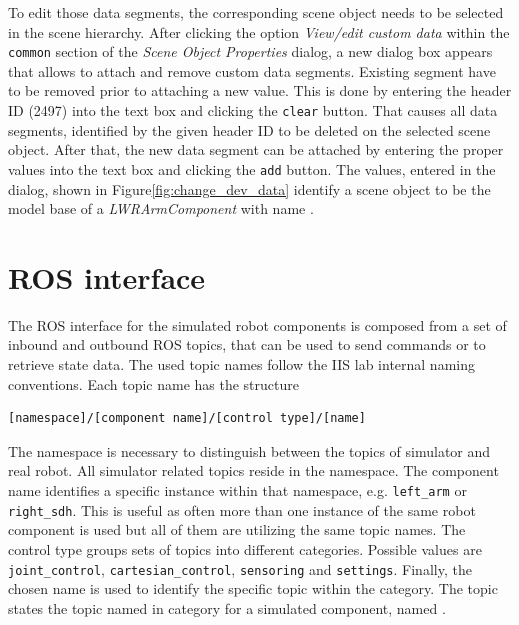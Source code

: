 To edit those data segments, the corresponding scene object needs to be selected in the scene hierarchy. After clicking the option \emph{View/edit custom data} within the \texttt{common} section of the \emph{Scene Object Properties} dialog, a new dialog box appears that allows to attach and remove custom data segments. Existing segment have to be removed prior to attaching a new value. This is done by entering the header ID (2497) into the text box and clicking the \texttt{clear} button. That causes all data segments, identified by the given header ID to be deleted on the selected scene object. After that, the new data segment can be attached by entering the proper values into the text box and clicking the \texttt{add} button. The values, entered in the dialog, shown in Figure\ref{fig:change_dev_data} identify a scene object to be the model base of a \emph{LWRArmComponent} with name .

\section{ROS interface}

The ROS interface for the simulated robot components is composed from a set of inbound and outbound ROS topics, that can be used to send commands or to retrieve state data. The used topic names follow the IIS lab internal naming conventions. Each topic name has the structure
\begin{verbatim}
[namespace]/[component name]/[control type]/[name]
\end{verbatim}
The namespace is necessary to distinguish between the topics of simulator and real robot. All simulator related topics reside in the  namespace. The component name identifies a specific instance within that namespace, e.g. \texttt{left\_arm} or \texttt{right\_sdh}. This is useful as often more than one instance of the same robot component is used but all of them are utilizing the same topic names. The control type groups sets of topics into different categories. Possible values are \texttt{joint\_control}, \texttt{cartesian\_control}, \texttt{sensoring} and \texttt{settings}. Finally, the chosen name is used to identify the specific topic within the category. The topic  states the topic named  in category  for a simulated component, named . \\

